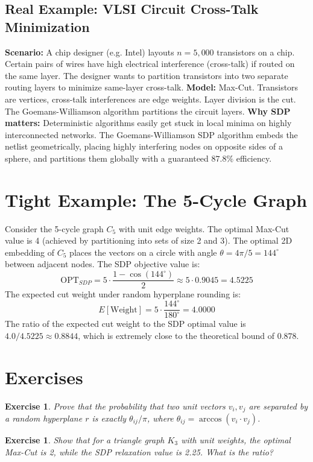 \documentclass[11pt,oneside]{book}
\newtheorem{exercise}[theorem]{Exercise}
\begin{document}
\subsection*{Real Example: VLSI Circuit Cross-Talk Minimization}
\textbf{Scenario:} A chip designer (e.g. Intel) layouts $n = 5,000$ transistors on a chip. Certain pairs of wires have high electrical interference (cross-talk) if routed on the same layer. The designer wants to partition transistors into two separate routing layers to minimize same-layer cross-talk.
\textbf{Model:} Max-Cut. Transistors are vertices, cross-talk interferences are edge weights. Layer division is the cut. The Goemans-Williamson algorithm partitions the circuit layers.
\textbf{Why SDP matters:} Deterministic algorithms easily get stuck in local minima on highly interconnected networks. The Goemans-Williamson SDP algorithm embeds the netlist geometrically, placing highly interfering nodes on opposite sides of a sphere, and partitions them globally with a guaranteed $87.8\%$ efficiency.

\section{Tight Example: The 5-Cycle Graph}
Consider the 5-cycle graph $C_5$ with unit edge weights. The optimal Max-Cut value is 4 (achieved by partitioning into sets of size 2 and 3).
The optimal 2D embedding of $C_5$ places the vectors on a circle with angle $\theta = 4\pi/5 = 144^\circ$ between adjacent nodes.
The SDP objective value is:
\[
\text{OPT}_{SDP} = 5 \cdot \frac{1 - \cos(144^\circ)}{2} \approx 5 \cdot 0.9045 = 4.5225
\]
The expected cut weight under random hyperplane rounding is:
\[
E[\text{Weight}] = 5 \cdot \frac{144^\circ}{180^\circ} = 4.0000
\]
The ratio of the expected cut weight to the SDP optimal value is $4.0 / 4.5225 \approx 0.8844$, which is extremely close to the theoretical bound of $0.878$.

\section{Exercises}
\begin{exercise}
Prove that the probability that two unit vectors $v_i, v_j$ are separated by a random hyperplane $r$ is exactly $\theta_{ij}/\pi$, where $\theta_{ij} = \arccos(v_i \cdot v_j)$.
\end{exercise}
\begin{exercise}
Show that for a triangle graph $K_3$ with unit weights, the optimal Max-Cut is 2, while the SDP relaxation value is 2.25. What is the ratio?
\end{exercise}
\end{document}
